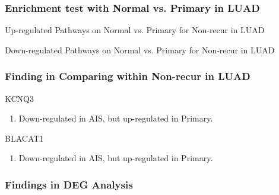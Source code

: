 \documentclass{beamer}
\begin{document}
    \begin{frame}
        \frametitle{Enrichment test with Normal vs. Primary in LUAD}

        \begin{table}
            \caption{Up-regulated Pathways on Normal vs. Primary for Non-recur in LUAD}
            \resizebox{\linewidth}{!}
            {}
        \end{table}

        \begin{table}
            \caption{Down-regulated Pathways on Normal vs. Primary for Non-recur in LUAD}
            \resizebox{\linewidth}{!}
            {}
        \end{table}
    \end{frame}

    \begin{frame}[allowframebreaks]
        \frametitle{Finding in Comparing within Non-recur in LUAD}

        \begin{block}{KCNQ3}
            \begin{enumerate}
                \item Down-regulated in AIS, but up-regulated in Primary.
            \end{enumerate}
        \end{block}

        \begin{block}{BLACAT1}
            \begin{enumerate}
                \item Down-regulated in AIS, but up-regulated in Primary.
            \end{enumerate}
        \end{block}
    \end{frame}

    \begin{frame}
        \frametitle{Findings in DEG Analysis}
    \end{frame}
\end{document}
